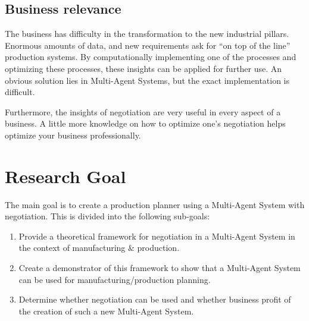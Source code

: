 \subsection{Business relevance}

The business has difficulty in the transformation to the new industrial pillars. Enormous amounts of data, and new requirements ask for ``on top of the line'' production systems. By computationally implementing one of the processes and optimizing these processes, these insights can be applied for further use. An obvious solution lies in Multi-Agent Systems, but the exact implementation is difficult. 

Furthermore, the insights of negotiation are very useful in every aspect of a business. A little more knowledge on how to optimize one's negotiation helps optimize your business professionally.
\section{Research Goal}
The main goal is to create a production planner using a Multi-Agent System with negotiation. This is divided into the following sub-goals:
\begin{enumerate}
	\item
	Provide a theoretical framework for negotiation in a Multi-Agent System in the context of manufacturing \& production.
	\item
	Create a demonstrator of this framework to show that a Multi-Agent System can be used for manufacturing/production planning.
	\item
	Determine whether negotiation can be used and whether business profit of the creation of such a new Multi-Agent System.
	
\end{enumerate} 


